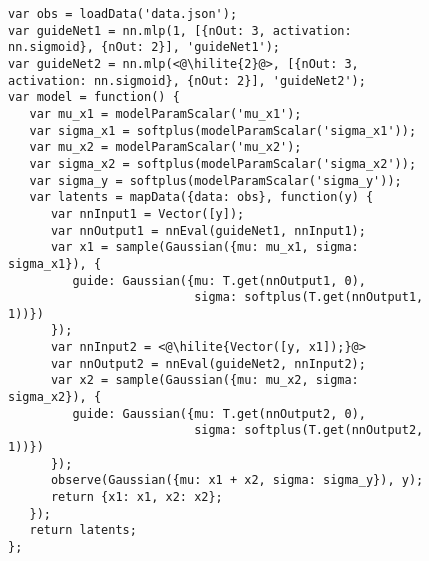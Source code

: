 \begin{figure}
\begin{minipage}{\linewidth}
\begin{minipage}{0.66\linewidth}
\begin{lstlisting}[style=smaller]
var obs = loadData('data.json');
var guideNet1 = nn.mlp(1, [{nOut: 3, activation: nn.sigmoid}, {nOut: 2}], 'guideNet1');
var guideNet2 = nn.mlp(<@\hilite{2}@>, [{nOut: 3, activation: nn.sigmoid}, {nOut: 2}], 'guideNet2');
var model = function() {
   var mu_x1 = modelParamScalar('mu_x1');
   var sigma_x1 = softplus(modelParamScalar('sigma_x1'));
   var mu_x2 = modelParamScalar('mu_x2');
   var sigma_x2 = softplus(modelParamScalar('sigma_x2'));
   var sigma_y = softplus(modelParamScalar('sigma_y'));
   var latents = mapData({data: obs}, function(y) {
      var nnInput1 = Vector([y]);
      var nnOutput1 = nnEval(guideNet1, nnInput1);
      var x1 = sample(Gaussian({mu: mu_x1, sigma: sigma_x1}), {
         guide: Gaussian({mu: T.get(nnOutput1, 0),
                          sigma: softplus(T.get(nnOutput1, 1))})
      });
      var nnInput2 = <@\hilite{Vector([y, x1]);}@>
      var nnOutput2 = nnEval(guideNet2, nnInput2);
      var x2 = sample(Gaussian({mu: mu_x2, sigma: sigma_x2}), {
         guide: Gaussian({mu: T.get(nnOutput2, 0),
                          sigma: softplus(T.get(nnOutput2, 1))})
      });
      observe(Gaussian({mu: x1 + x2, sigma: sigma_y}), y);
      return {x1: x1, x2: x2};
   });
   return latents;
};
\end{lstlisting}
\end{minipage}
%
\begin{minipage}{0.33\linewidth}
\begin{flushright}
\end{flushright}
\end{minipage}
\end{minipage}


\end{figure}
